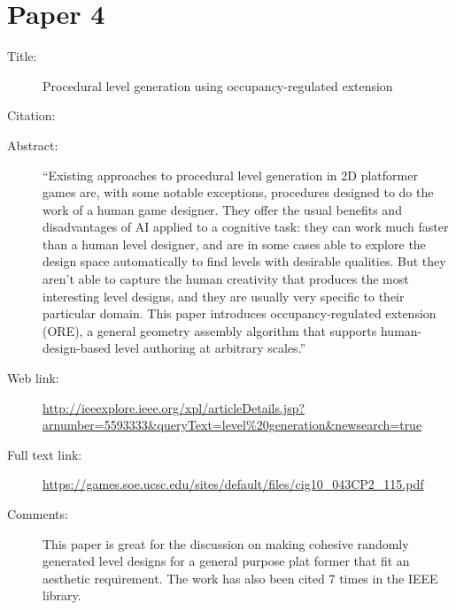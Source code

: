 \documentclass{scrartcl}
\begin{document}
\section*{Paper 4}
\begin{description}
\item[Title:] 
Procedural level generation using occupancy-regulated extension
\item[Citation:] \cite{Mawhorter}
\item[Abstract:] ``Existing approaches to procedural level generation in 2D platformer games are, with some notable exceptions, procedures designed to do the work of a human game designer. They offer the usual benefits and disadvantages of AI applied to a cognitive task: they can work much faster than a human level designer, and are in some cases able to explore the design space automatically to find levels with desirable qualities. But they aren't able to capture the human creativity that produces the most interesting level designs, and they are usually very specific to their particular domain. This paper introduces occupancy-regulated extension (ORE), a general geometry assembly algorithm that supports human-design-based level authoring at arbitrary scales.''
\item[Web link:] \url{http://ieeexplore.ieee.org/xpl/articleDetails.jsp?arnumber=5593333&queryText=level\%20generation&newsearch=true}
\item[Full text link:] \url{https://games.soe.ucsc.edu/sites/default/files/cig10_043CP2_115.pdf}
\item[Comments:] This paper is great for the discussion on making cohesive randomly generated level designs for a general purpose plat former that fit an aesthetic requirement. The work has also been cited 7 times in the IEEE library.
\end{description}
\end{document}
